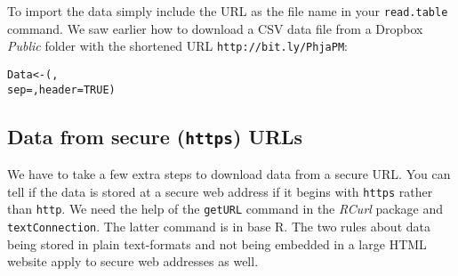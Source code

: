 To import the data simply include the URL as the file name in your \texttt{read.table} command. We saw earlier how to download a CSV data file from a Dropbox \emph{Public} folder with the shortened URL \texttt{http://bit.ly/PhjaPM}:

\begin{knitrout}
\color{fgcolor}\begin{kframe}
\begin{alltt}
Data <- (, 
                    sep = , header = TRUE)
\end{alltt}
\end{kframe}
\end{knitrout}


\subsection{Data from secure ({\tt{https}}) URLs}

We have to take a few extra steps to download data from a secure URL. You can tell if the data is stored at a secure web address if it begins with \texttt{https} rather than \texttt{http}. We need the help of the \texttt{getURL} command in the {\emph{RCurl}} package \cite[]{R-RCurl} and \texttt{textConnection}. The latter command is in base R. The two rules about data being stored in plain text-formats and not being embedded in a large HTML website apply to secure web addresses as well.

